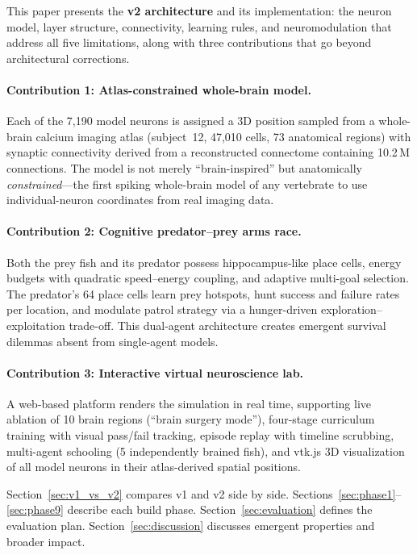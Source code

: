 \documentclass[11pt,a4paper]{article}
\begin{document}
This paper presents the \textbf{v2 architecture} and its implementation:
the neuron model, layer structure, connectivity, learning rules, and
neuromodulation that address all five limitations, along with three
contributions that go beyond architectural corrections.

\paragraph{Contribution 1: Atlas-constrained whole-brain model.}
Each of the 7,190 model neurons is assigned a 3D position sampled from a
whole-brain calcium imaging atlas (subject~12, 47,010 cells, 73 anatomical
regions) with synaptic connectivity derived from a reconstructed connectome
containing 10.2\,M connections. The model is not merely ``brain-inspired'' but
anatomically \emph{constrained}---the first spiking whole-brain model of any
vertebrate to use individual-neuron coordinates from real imaging data.

\paragraph{Contribution 2: Cognitive predator--prey arms race.}
Both the prey fish and its predator possess hippocampus-like place cells,
energy budgets with quadratic speed--energy coupling, and adaptive multi-goal
selection. The predator's 64 place cells learn prey hotspots, hunt success and
failure rates per location, and modulate patrol strategy via a hunger-driven
exploration--exploitation trade-off. This dual-agent architecture creates
emergent survival dilemmas absent from single-agent models.

\paragraph{Contribution 3: Interactive virtual neuroscience lab.}
A web-based platform renders the simulation in real time, supporting live
ablation of 10 brain regions (``brain surgery mode''), four-stage curriculum
training with visual pass/fail tracking, episode replay with timeline
scrubbing, multi-agent schooling (5 independently brained fish), and vtk.js
3D visualization of all model neurons in their atlas-derived spatial positions.

Section~\ref{sec:v1_vs_v2} compares v1 and v2 side by side.
Sections~\ref{sec:phase1}--\ref{sec:phase9} describe each build phase.
Section~\ref{sec:evaluation} defines the evaluation plan.
Section~\ref{sec:discussion} discusses emergent properties and broader impact.
\end{document}
